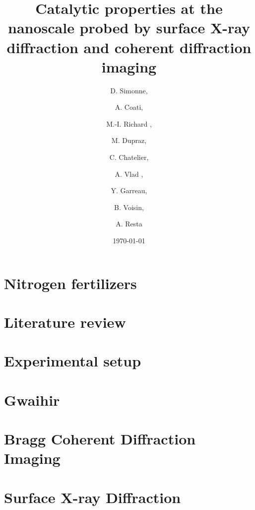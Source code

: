 \documentclass[xcolor=table, t, 9pt, head=0cm]{beamer}
\title[Main Title]
{   
    Catalytic properties at the nanoscale probed by surface X-ray diffraction and coherent diffraction imaging
}
\author
{D. Simonne\inst{1, 2},\and A. Coati\inst{1},\and M.-I. Richard \inst{2, 3},\and M. Dupraz\inst{2, 3},\and C. Chatelier\inst{2, 3},\and A. Vlad \inst{1},\and Y. Garreau\inst{1},\and B. Voisin\inst{1},\and A. Resta\inst{1}}
\institute
{
    \inst{1}
    Synchrotron SOLEIL
    \and
    \inst{2}
    Commissariat à l’énergie atomique et aux énergies alternatives – CEA Grenoble
    \and
    \inst{3}
    ESRF -- The European Synchrotron
}
\date{\footnotesize{\today}}
\begin{document}
	\begin{frame}[plain]
		\titlepage
	\end{frame}

    \section{Nitrogen fertilizers}
    
    
    
    
    

    \section{Literature review}
    
    
    
	\section{Experimental setup}
    
    
    
    
    

    \section{Gwaihir}
        
    
    
    

    \section{Bragg Coherent Diffraction Imaging}
    
    
    
    

    \section{Surface X-ray Diffraction}
    
    
    
    
    
    
    
    
    
    
    
    
    
\end{document}
